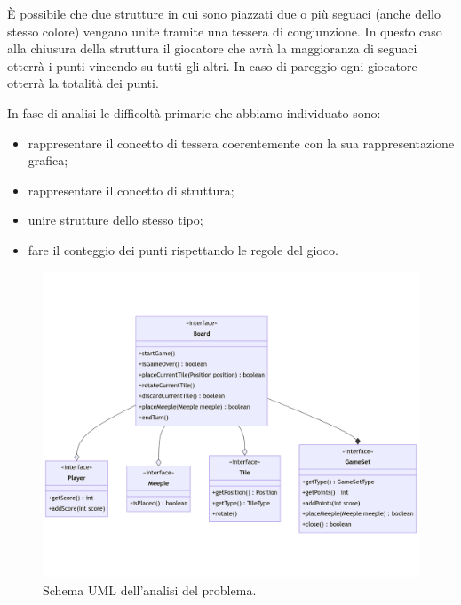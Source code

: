 È possibile che due strutture in cui sono piazzati due o più seguaci (anche dello stesso colore) vengano unite tramite una tessera di congiunzione. In questo caso alla chiusura della struttura il giocatore che avrà la maggioranza di seguaci otterrà i punti vincendo su tutti gli altri. In caso di pareggio ogni giocatore otterrà la totalità dei punti.
\medskip

In fase di analisi le difficoltà primarie che abbiamo individuato sono:
\begin{itemize}
    \item rappresentare il concetto di tessera coerentemente con la sua rappresentazione grafica;
    \item rappresentare il concetto di struttura;
    \item unire strutture dello stesso tipo;
    \item fare il conteggio dei punti rispettando le regole del gioco.
\end{itemize}

\begin{figure}[hb]
    \centering\includegraphics[scale=0.25]{images/analisi_uml.png}
    \caption{Schema UML dell'analisi del problema.}
\end{figure}
\clearpage
